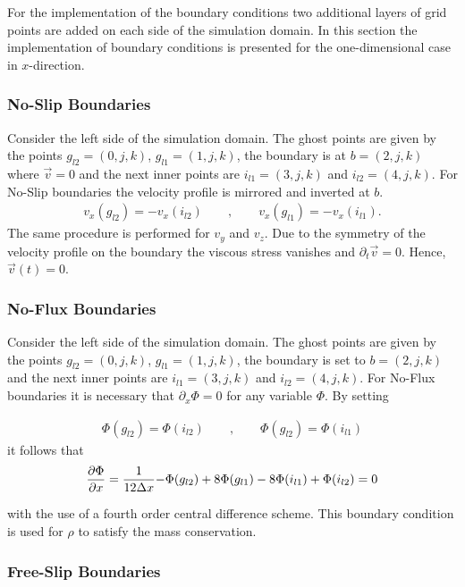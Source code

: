 For the implementation of the boundary conditions two additional layers of grid points are added on each side of the simulation domain.
In this section the implementation of boundary conditions is presented for the one-dimensional case in $x$-direction.

\subsubsection{No-Slip Boundaries}

Consider the left side of the simulation domain.
The ghost points are given by the points ${g_{l2}=(0, j, k)}$, ${g_{l1}=(1, j, k)}$,
the boundary is at ${b=(2, j, k)}$ where $\vec{v}=0$ and the next inner points are
$i_{l1}=(3, j, k)$ and $i_{l2}=(4, j, k)$.
For No-Slip boundaries the velocity profile is mirrored and inverted at $b$.
\begin{align}
    v_x(g_{l2}) = -v_x(i_{l2}) \qquad , \qquad v_x(g_{l1}) = -v_x(i_{l1}).
\end{align}
The same procedure is performed for $v_y$ and $v_z$.
Due to the symmetry of the velocity profile on the boundary the viscous stress vanishes and $\partial_t\vec{v} = 0$. Hence, $\vec{v}(t)=0$.


\subsubsection{No-Flux Boundaries}

Consider the left side of the simulation domain.
The ghost points are given by the points ${g_{l2}=(0, j, k)}$, ${g_{l1}=(1, j, k)}$,
the boundary is set to  ${b=(2, j, k)}$ and the next inner points are
$i_{l1}=(3, j, k)$ and $i_{l2}=(4, j, k)$.
For No-Flux boundaries it is necessary that $\partial_x\Phi = 0$ for any variable $\Phi$.
By setting

\begin{align}
    \Phi(g_{l2}) = \Phi(i_{l2})\qquad , \qquad \Phi(g_{l2}) = \Phi(i_{l1})
\end{align}
it follows that
\begin{align}
    \pdn[\Phi]{x} = \frac{1}{12\Delta x}{-\Phi(g_{l2})+8\Phi(g_{l1}) -8\Phi(i_{l1}) + \Phi(i_{l2})} = 0
\end{align}

with the use of a fourth order central difference scheme.
This boundary condition is used for $\rho$ to satisfy the mass conservation.

\subsubsection{Free-Slip Boundaries}

